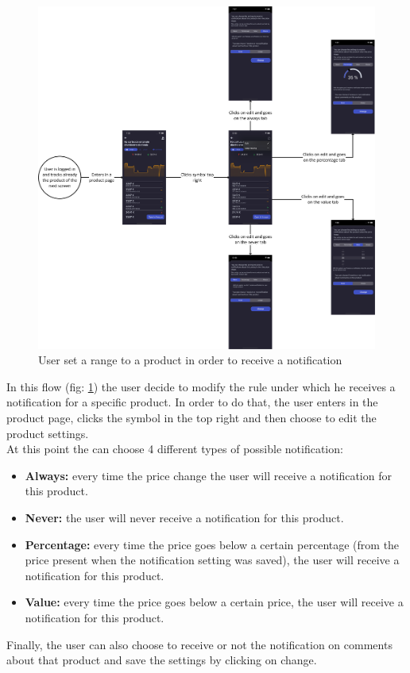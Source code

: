 \begin{figure}[h!]
        \centering
        \includegraphics[scale=0.12]{images/interfaces/user_set_range_for_notification.png}
        \caption{User set a range to a product in order to receive a notification}
        \label{fig:user_set_range_for_notification}
\end{figure}
\FloatBarrier
In this flow (fig: \ref{fig:user_set_range_for_notification}) the user decide to modify the rule under which he receives a notification for a specific product. In order to do that, the user enters in the product page, clicks the symbol in the top right and then choose to edit the product settings.\\
At this point the can choose 4 different types of possible notification:
\begin{itemize}
    \item \textbf{Always:} every time the price change the user will receive a notification for this product.
    \item \textbf{Never:} the user will never receive a notification for this product.
    \item \textbf{Percentage:} every time the price goes below a certain percentage (from the price present when the notification setting was saved), the user will receive a notification for this product.
    \item \textbf{Value:} every time the price goes below a certain price, the user will receive a notification for this product.
\end{itemize}
Finally, the user can also choose to receive or not the notification on comments about that product and save the settings by clicking on change.

